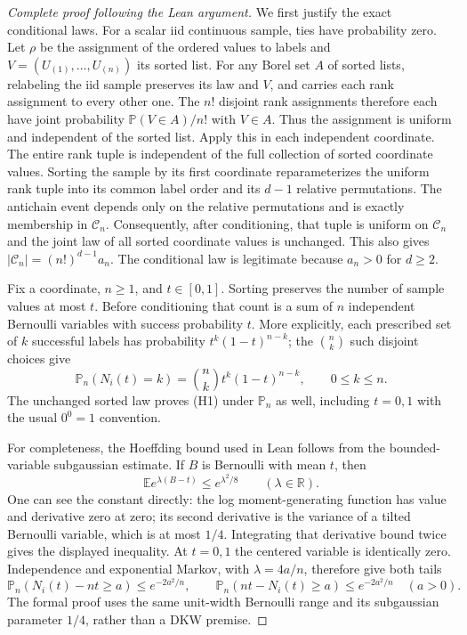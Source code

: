 \begin{proof}[Complete proof following the Lean argument]
We first justify the exact conditional laws. For a scalar iid continuous
sample, ties have probability zero. Let $\rho$ be the assignment of the
ordered values to labels and $V=(U_{(1)},\ldots,U_{(n)})$ its sorted list.
For any Borel set $A$ of sorted lists, relabeling the iid sample preserves
its law and $V$, and carries each rank assignment to every other one.
The $n!$ disjoint rank assignments therefore each have joint probability
$\mathbb P(V\in A)/n!$ with $V\in A$.
Thus the assignment is uniform and independent of the sorted list.
Apply this in each independent coordinate. The entire rank tuple is
independent of the full collection of sorted coordinate values.
Sorting the sample by its first coordinate reparameterizes the uniform
rank tuple into its common label order and its $d-1$ relative permutations.
The antichain event depends only on the relative permutations and is
exactly membership in $\mathcal C_n$.
Consequently, after conditioning, that tuple is uniform on $\mathcal C_n$
and the joint law of all sorted coordinate values is unchanged.
This also gives $|\mathcal C_n|=(n!)^{d-1}a_n$.
The conditional law is legitimate because $a_n>0$ for $d\ge2$.

Fix a coordinate, $n\ge1$, and $t\in[0,1]$. Sorting preserves the number
of sample values at most $t$. Before conditioning that count is a sum
of $n$ independent Bernoulli variables with success probability $t$.
More explicitly, each prescribed set of $k$ successful labels has
probability $t^k(1-t)^{n-k}$; the $\binom nk$ such disjoint choices give
\[
 \mathbb P_n(N_i(t)=k)=\binom nk t^k(1-t)^{n-k},
 \qquad 0\le k\le n.                           \tag{H1}
\]
The unchanged sorted law proves (H1) under $\mathbb P_n$ as well,
including $t=0,1$ with the usual $0^0=1$ convention.

For completeness, the Hoeffding bound used in Lean follows from the
bounded-variable subgaussian estimate. If $B$ is Bernoulli with mean $t$,
then
\[
        \mathbb E e^{\lambda(B-t)}\le e^{\lambda^2/8}
        \qquad(\lambda\in\mathbb R).
\]
One can see the constant directly: the log moment-generating function
has value and derivative zero at zero; its second derivative is the
variance of a tilted Bernoulli variable, which is at most $1/4$.
Integrating that derivative bound twice gives the displayed inequality.
At $t=0,1$ the centered variable is identically zero.
Independence and exponential Markov, with $\lambda=4a/n$, therefore give
both tails
\[
 \mathbb P_n(N_i(t)-nt\ge a)\le e^{-2a^2/n},\qquad
 \mathbb P_n(nt-N_i(t)\ge a)\le e^{-2a^2/n}
 \quad(a>0).                                  \tag{H2}
\]
The formal proof uses the same unit-width Bernoulli range and its
subgaussian parameter $1/4$, rather than a DKW premise.


\end{proof}
